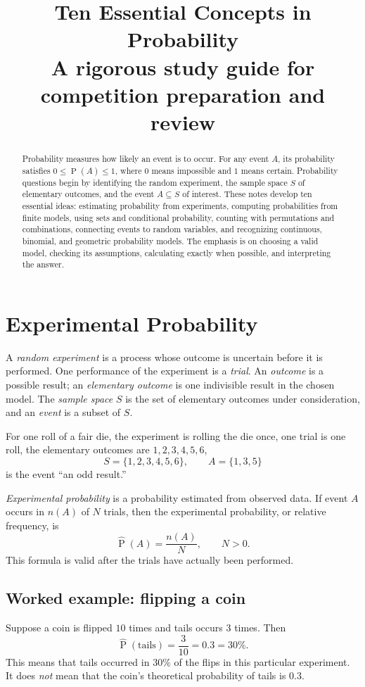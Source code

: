 \documentclass[11pt]{article}
\title{\textbf{Ten Essential Concepts in Probability}\\[0.4em]
  \large A rigorous study guide for competition preparation and review}
\author{}
\date{}
\newcommand{\Pp}{\operatorname{P}}
\begin{document}
\maketitle

\begin{abstract}
Probability measures how likely an event is to occur.  For any event $A$, its
probability satisfies $0\leq \Pp(A)\leq 1$, where $0$ means impossible and $1$
means certain.  Probability questions begin by identifying the random experiment,
the sample space $S$ of elementary outcomes, and the event $A\subseteq S$ of
interest.  These notes develop ten essential ideas: estimating probability from
experiments, computing probabilities from finite models, using sets and
conditional probability, counting with permutations and combinations, connecting
events to random variables, and recognizing continuous, binomial, and geometric
probability models.  The emphasis is on choosing a valid model, checking its
assumptions, calculating exactly when possible, and interpreting the answer.
\end{abstract}

\tableofcontents
\newpage

\section{Experimental Probability}\label{sec:experimental}
A \emph{random experiment} is a process whose outcome is uncertain before it is
performed.  One performance of the experiment is a \emph{trial}.  An
\emph{outcome} is a possible result; an \emph{elementary outcome} is one
indivisible result in the chosen model.  The \emph{sample space} $S$ is the set
of elementary outcomes under consideration, and an \emph{event} is a subset of
$S$.

\begin{keybox}
For one roll of a fair die, the experiment is rolling the die once, one trial is
one roll, the elementary outcomes are $1,2,3,4,5,6$,
\[
S=\{1,2,3,4,5,6\},\qquad A=\{1,3,5\}
\]
is the event ``an odd result.''
\end{keybox}

\emph{Experimental probability} is a probability estimated from observed data.
If event $A$ occurs in $n(A)$ of $N$ trials, then the experimental probability,
or relative frequency, is
\[
\widehat{\Pp}(A)=\frac{n(A)}{N},\qquad N>0.
\]
This formula is valid after the trials have actually been performed.

\subsection{Worked example: flipping a coin}
Suppose a coin is flipped $10$ times and tails occurs $3$ times.  Then
\[
\widehat{\Pp}(\text{tails})=\frac{3}{10}=0.3=30\%.
\]
This means that tails occurred in $30\%$ of the flips in this particular
experiment.  It does \emph{not} mean that the coin's theoretical probability of
tails is $0.3$.
\end{document}
